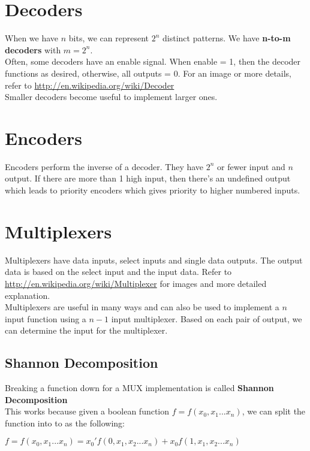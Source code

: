 \documentclass[12pt]{report}
\begin{document}
	\section{Decoders}
		When we have $n$ bits, we can represent $2^n$ distinct patterns. We have \textbf{n-to-m decoders} with $m = 2^n$.\\
		Often, some decoders have an enable signal. When enable = 1, then the decoder functions as desired, otherwise, all outputs = 0. For an image or more details, refer to \url{http://en.wikipedia.org/wiki/Decoder}\\
		Smaller decoders become useful to implement larger ones.
	\section{Encoders}
	 	Encoders perform the inverse of a decoder. They have $2^n$ or fewer input and $n$ output. If there are more than 1 high input, then there's an undefined output which leads to priority encoders which gives priority to higher numbered inputs.
	 \section{Multiplexers}
	 	Multiplexers have data inputs, select inputs and single data outputs. The output data is based on the select input and the input data. Refer to \url{http://en.wikipedia.org/wiki/Multiplexer} for images and more detailed explanation.\\
	 	Multiplexers are useful in many ways and can also be used to implement a $n$ input function using a $n-1$ input multiplexer. Based on each pair of output, we can determine the input for the multiplexer. 
	 	\subsection{Shannon Decomposition}
	 		Breaking a function down for a MUX implementation is called \textbf{Shannon Decomposition}\\
	 		This works because given a boolean function $f = f(x_0, x_1...x_n)$, we can split the function into to as the following:\\
	 		\centerline{$f = f(x_0, x_1...x_n) = x_0'f(0, x_1, x_2 ... x_n) + x_0f(1, x_1, x_2...x_n)$}
	 		
\end{document}
